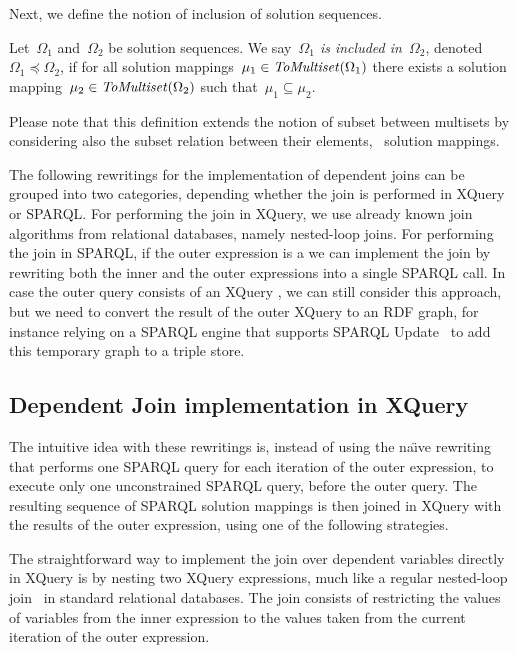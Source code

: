 Next, we define the notion of inclusion of solution sequences.  
%
\begin{definition}
  Let~$\Omega_1$ and~$\Omega_2$ be solution sequences. We say~\emph{$\Omega_1$ is included in~$\Omega_2$},
  denoted~$\Omega_1 \preceq \Omega_2$, if for all solution mappings~$\mu_1 \in \mathit{ToMultiset}\!\left(\Omega_1\right)$ there
  exists a solution mapping~$\mu_2 \in \mathit{ToMultiset}\!\left(\Omega_2\right)$ such that~$\mu_1 \subseteq \mu_2$. 
\end{definition}
%
Please note that this definition extends the notion of subset between multisets by considering also the subset relation
between their elements, \ie~solution mappings. 


The following rewritings for the implementation of dependent joins can be grouped into two categories, depending whether
the join is performed in XQuery or SPARQL.  For performing the join in XQuery, we use already known join algorithms from
relational databases, namely nested-loop joins.
%
For performing the join in SPARQL, if the outer expression is a \SparqlForClause we can implement the join by rewriting
both the inner and the outer expressions into a single SPARQL call.  In case the outer query consists of an XQuery
\ForClause, we can still consider this approach, but we need to convert the result of the outer XQuery \ForClause to an
\ac{RDF} graph, for instance relying on a SPARQL engine that supports SPARQL Update~\cite{GearonPassantPolleres:2012aa}
to add this temporary graph to a triple store.


\subsection{Dependent Join implementation in XQuery}
\label{sec:join-impl-xquery}
The intuitive idea with these rewritings is, instead of using the na\"{\i}ve rewriting that performs one SPARQL query
for each iteration of the outer expression, to execute only one unconstrained SPARQL query, before the outer query.  The
resulting sequence of SPARQL solution mappings is then joined in XQuery with the results of the outer expression, using
one of the following strategies. 


The straightforward way to implement the join over dependent variables directly in XQuery is by nesting two XQuery \FOR
expressions, much like a regular nested-loop join~\cite{AbiteboulHullVianu:1995aa} in standard relational databases.
The join consists of restricting the values of variables from the inner expression to the values taken from the current
iteration of the outer expression. 


